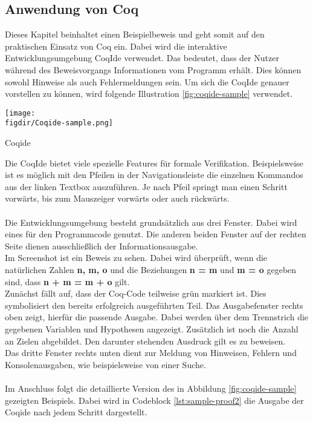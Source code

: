 \subsection{Anwendung von Coq}
Dieses Kapitel beinhaltet einen Beispielbeweis und geht somit auf den praktischen Einsatz von Coq ein. Dabei wird die interaktive Entwicklungsumgebung CoqIde verwendet. Das bedeutet, dass der Nutzer während des Beweisvorgangs Informationen vom Programm erhält. Dies können sowohl Hinweise als auch Fehlermeldungen sein. Um sich die CoqIde genauer vorstellen zu können, wird folgende Illustration \ref{fig:coqide-sample} verwendet.\\

\begin{minipage}{\textwidth}
	\centering
	\captionsetup{type=figure}
	\texttt{[image: \\figdir/Coqide-sample.png]}
	\caption{Coqide}
	\label{fig:coqide-sample}
\end{minipage}
Die CoqIde bietet viele spezielle Features für formale Verifikation. Beispielsweise ist es möglich mit den Pfeilen in der Navigationsleiste die einzelnen Kommandos aus der linken Textbox auszuführen. Je nach Pfeil springt man einen Schritt vorwärts, bis zum Mauszeiger vorwärts oder auch rückwärts.\\
\\
Die Entwicklungsumgebung besteht grundsätzlich aus drei Fenster. Dabei wird eines für den Programmcode genutzt. Die anderen beiden Fenster auf der rechten Seite dienen ausschließlich der Informationsausgabe.\\
Im Screenshot ist ein Beweis zu sehen. Dabei wird überprüft, wenn die natürlichen Zahlen \textbf{n, m, o} und die Beziehungen \textbf{n = m} und \textbf{m = o} gegeben sind, dass \textbf{n + m = m + o} gilt.\\
Zunächst fällt auf, dass der Coq-Code teilweise grün markiert ist. Dies symbolisiert den bereits erfolgreich ausgeführten Teil. Das Ausgabefenster rechts oben zeigt, hierfür die passende Ausgabe. Dabei werden über dem Trennstrich die gegebenen Variablen und Hypothesen angezeigt. Zusätzlich ist noch die Anzahl an Zielen abgebildet. Den darunter stehenden Ausdruck gilt es zu beweisen.\\
Das dritte Fenster rechts unten dient zur Meldung von Hinweisen, Fehlern und Konsolenausgaben, wie beispielsweise von einer Suche.\\
\\
Im Anschluss folgt die detaillierte Version des in Abbildung \ref{fig:coqide-sample} gezeigten Beispiels. Dabei wird in Codeblock \ref{lst:sample-proof2} die Ausgabe der Coqide nach jedem Schritt dargestellt.
